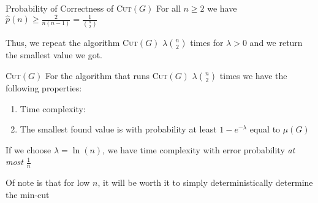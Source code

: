 \begin{lemma}[]{Probability of Correctness of \textsc{Cut}$(G)$}
    For all $n \geq 2$ we have $\displaystyle \hat{p}(n) \geq \frac{2}{n(n - 1)} = \frac{1}{{n \choose 2}}$
\end{lemma}
Thus, we repeat the algorithm \textsc{Cut}$(G)$ $\lambda {n \choose 2}$ times for $\lambda > 0$ and we return the smallest value we got.
\begin{theorem}[]{\textsc{Cut}$(G)$}
    For the algorithm that runs \textsc{Cut}$(G)$ $\lambda{n \choose 2}$ times we have the following properties:
    \begin{enumerate}[label=(\arabic*)]
        \item Time complexity: 
        \item The smallest found value is with probability at least $1 - e^{-\lambda}$ equal to $\mu(G)$
    \end{enumerate}
\end{theorem}
If we choose $\lambda = \ln(n)$, we have time complexity  with error probability \textit{at most} $\frac{1}{n}$

Of note is that for low $n$, it will be worth it to simply deterministically determine the min-cut
